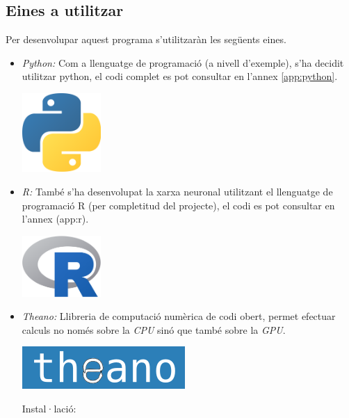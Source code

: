 \documentclass[12pt]{article}
\begin{document}
\clearpage
\subsection{Eines a utilitzar}
Per desenvolupar aquest programa s'utilitzaràn les següents eines.
\begin{itemize}
	\item \textit{Python:} Com a llenguatge de programació (a nivell d'exemple), s'ha decidit utilitzar python, el codi complet es pot consultar en l'annex \ref{app:python}.
	\begin{center}
		\includegraphics[width=3cm]{imatges/eines/python.png}
	\end{center}
	
	\item \textit{R:} També s'ha desenvolupat la xarxa neuronal utilitzant el llenguatge de programació R (per completitud del projecte), el codi es pot consultar en l'annex (app:r).
	\begin{center}
		\includegraphics[width=3cm]{imatges/eines/r.png}
	\end{center}	
	
	\item \textit{Theano:} Llibreria de computació numèrica de codi obert, permet efectuar calculs no només sobre la \textit{CPU} sinó que també sobre la \textit{GPU}.
	\begin{center}
		\includegraphics[scale=0.4]{imatges/eines/theano.png}
	\end{center}
	Instal·lació: 	
	

\end{itemize}
\end{document}
